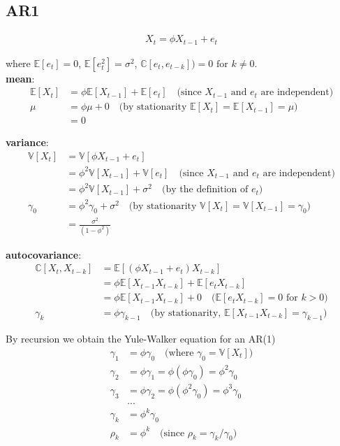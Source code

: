 \documentclass[docs/main.tex]{subfiles}
\begin{document}
\subsection*{AR1}

\begin{align}
    X_t = \phi X_{t-1} + e_t \label{eq:ar1-1}
\end{align}

where $\mathbb{E}[e_t] = 0$, $\mathbb{E}[e_t^2] = \sigma^2$, $\mathbb{C}[e_t, e_{t-k}]) = 0\text{ for }k\ne0$.\\


\textbf{mean}:
\begin{align}
    \mathbb{E}[X_t] &= \phi \mathbb{E}[X_{t-1}] + \mathbb{E}[e_t] \quad\text{(since $X_{t-1}$ and $e_t$ are independent)}\\
    \mu &= \phi \mu + 0 \quad\text{(by stationarity $\mathbb{E}[X_t] = \mathbb{E}[X_{t-1}] = \mu$)}\\
    &= 0
\end{align}


\textbf{variance}:
\begin{align}
    \mathbb{V}[X_t] &= \mathbb{V}[\phi X_{t-1} + e_t]\\
    &= \phi^2 \mathbb{V}[X_{t-1}] + \mathbb{V}[e_t] \quad \text{(since $X_{t-1}$ and $e_t$ are independent)}\\
    &= \phi^2 \mathbb{V}[X_{t-1}] + \sigma^2 \quad \text{(by the definition of $e_t$)}\\
    \gamma_0 &= \phi^2 \gamma_0 + \sigma^2 \quad \text{(by stationarity $\mathbb{V}[X_t] = \mathbb{V}[X_{t-1}] = \gamma_0$)}\\
    &= \frac{\sigma^2}{(1 - \phi^2)}
\end{align}

\textbf{autocovariance}:
\begin{align}
    \mathbb{C}[X_t,X_{t-k}] &= \mathbb{E}[(\phi X_{t-1} + e_t) X_{t-k}]\\
    &= \phi \mathbb{E}[X_{t-1}X_{t-k}] + \mathbb{E}[e_t X_{t-k}]\\
    &= \phi \mathbb{E}[X_{t-1} X_{t-k}] + 0 \quad \text{($\mathbb{E}[e_t X_{t-k}] = 0$ for $k>0$)}\\
    \gamma_k &= \phi \gamma_{k-1} \quad \text{(by stationarity, $\mathbb{E}[X_{t-1}X_{t-k}] = \gamma_{k-1}$)}
\end{align}

By recursion we obtain the Yule-Walker equation for an AR(1)
\begin{align}
    \gamma_1 &= \phi \gamma_0 \quad \text{(where $\gamma_0 = \mathbb{V}[X_t]$)}\\
    \gamma_2 &= \phi\gamma_1 = \phi(\phi\gamma_0) = \phi^2\gamma_0\\
    \gamma_3 &= \phi\gamma_2 = \phi(\phi^2\gamma_0) = \phi^3\gamma_0\\
    &...\\
    \gamma_k &= \phi^k\gamma_0\\
    \rho_k &= \phi^k \quad \text{(since $\rho_k = \gamma_k / \gamma_0$)}
\end{align}
\end{document}
